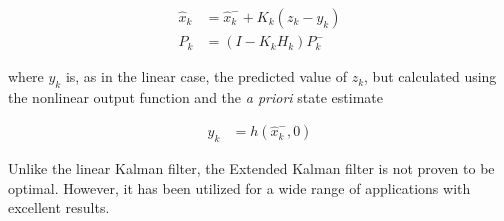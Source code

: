 \begin{align}
\hat{x}_k &=\hat{x}^-_{k}+K_k(z_k-y_k)\\
\label{kalmanVariance}
P_k &=(I-K_kH_k)P^-_k
\end{align}

where $y_k$ is, as in the linear case, the predicted value of $z_k$, but calculated using the nonlinear output function and the \textit{a priori} state estimate

\begin{align}
y_k &= h(\hat{x}^-_k,0)
\end{align}

Unlike the linear Kalman filter, the Extended Kalman filter is not proven to be optimal. However, it has been utilized for a wide range of applications with excellent results.
